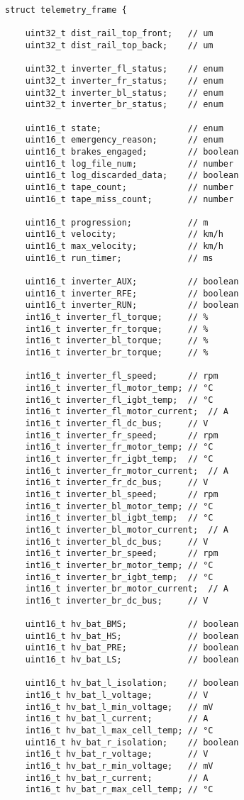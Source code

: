 \begin{verbatim}
struct telemetry_frame {

    uint32_t dist_rail_top_front;   // um
    uint32_t dist_rail_top_back;    // um

    uint32_t inverter_fl_status;    // enum
    uint32_t inverter_fr_status;    // enum
    uint32_t inverter_bl_status;    // enum
    uint32_t inverter_br_status;    // enum

    uint16_t state;                 // enum
    uint16_t emergency_reason;      // enum
    uint16_t brakes_engaged;        // boolean
    uint16_t log_file_num;          // number
    uint16_t log_discarded_data;    // boolean
    uint16_t tape_count;            // number
    uint16_t tape_miss_count;       // number

    uint16_t progression;           // m
    uint16_t velocity;              // km/h
    uint16_t max_velocity;          // km/h
    uint16_t run_timer;             // ms

    uint16_t inverter_AUX;          // boolean
    uint16_t inverter_RFE;          // boolean
    uint16_t inverter_RUN;          // boolean
    int16_t inverter_fl_torque;     // %
    int16_t inverter_fr_torque;     // %
    int16_t inverter_bl_torque;     // %
    int16_t inverter_br_torque;     // %

    int16_t inverter_fl_speed;      // rpm
    int16_t inverter_fl_motor_temp; // °C
    int16_t inverter_fl_igbt_temp;  // °C
    int16_t inverter_fl_motor_current;  // A
    int16_t inverter_fl_dc_bus;     // V
    int16_t inverter_fr_speed;      // rpm
    int16_t inverter_fr_motor_temp; // °C
    int16_t inverter_fr_igbt_temp;  // °C
    int16_t inverter_fr_motor_current;  // A
    int16_t inverter_fr_dc_bus;     // V
    int16_t inverter_bl_speed;      // rpm
    int16_t inverter_bl_motor_temp; // °C
    int16_t inverter_bl_igbt_temp;  // °C
    int16_t inverter_bl_motor_current;  // A
    int16_t inverter_bl_dc_bus;     // V
    int16_t inverter_br_speed;      // rpm
    int16_t inverter_br_motor_temp; // °C
    int16_t inverter_br_igbt_temp;  // °C
    int16_t inverter_br_motor_current;  // A
    int16_t inverter_br_dc_bus;     // V

    uint16_t hv_bat_BMS;            // boolean
    uint16_t hv_bat_HS;             // boolean
    uint16_t hv_bat_PRE;            // boolean
    uint16_t hv_bat_LS;             // boolean

    uint16_t hv_bat_l_isolation;    // boolean
    int16_t hv_bat_l_voltage;       // V
    int16_t hv_bat_l_min_voltage;   // mV
    int16_t hv_bat_l_current;       // A
    int16_t hv_bat_l_max_cell_temp; // °C
    uint16_t hv_bat_r_isolation;    // boolean
    int16_t hv_bat_r_voltage;       // V
    int16_t hv_bat_r_min_voltage;   // mV
    int16_t hv_bat_r_current;       // A
    int16_t hv_bat_r_max_cell_temp; // °C


\end{verbatim}
